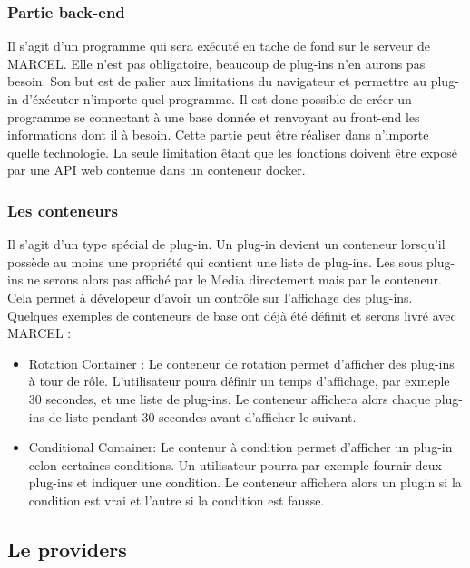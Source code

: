   \subsubsection{Partie \gls{back-end}}

    Il s'agit d'un programme qui sera exécuté en tache de fond sur le serveur de MARCEL. Elle n'est pas obligatoire, beaucoup de plug-ins n'en aurons pas besoin. Son but est de palier aux limitations du navigateur et permettre au plug-in d'éxécuter n'importe quel programme. Il est donc possible de créer un programme se connectant à une base donnée et renvoyant au front-end les informations dont il à besoin. Cette partie peut être réaliser dans n'importe quelle technologie. La seule limitation êtant que les fonctions doivent être exposé par une \gls{API web} contenue dans un \gls{conteneur} \gls{docker}.

  \subsubsection{Les conteneurs}

    Il s'agit d'un type spécial de plug-in. Un plug-in devient un conteneur lorsqu'il possède au moins une propriété qui contient une liste de plug-ins. Les sous plug-ins ne serons alors pas affiché par le Media directement mais par le conteneur. Cela permet à dévelopeur d'avoir un contrôle sur l'affichage des plug-ins. Quelques exemples de conteneurs de base ont déjà été définit et serons livré avec MARCEL :

    \begin{itemize}
      \item{Rotation Container : Le conteneur de rotation permet d'afficher des plug-ins à tour de rôle. L'utilisateur poura définir un temps d'affichage, par exmeple 30 secondes, et une liste de plug-ins. Le conteneur affichera alors chaque plug-ins de liste pendant 30 secondes avant d'afficher le suivant.}
      \item{Conditional Container: Le contenur à condition permet d'afficher un plug-in celon certaines conditions. Un utilisateur pourra par exemple fournir deux plug-ins et indiquer une condition. Le conteneur affichera alors un plugin si la condition est vrai et l'autre si la condition est fausse.}
    \end{itemize}

\subsection{Le providers}

